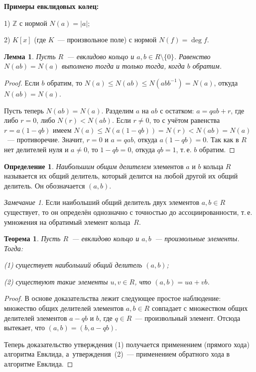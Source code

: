 \documentclass[a4paper,10pt]{amsart}
\def\ZZ{{\mathbb Z}}%
\newtheorem{theorem}{Теорема}
\newtheorem{lemma}{Лемма}
\theoremstyle{definition}
\newtheorem{definition}{Определение}
\theoremstyle{remark}
\newtheorem{remark}{Замечание}
\begin{document}
\textbf{Примеры евклидовых колец:}

1) $\ZZ$ с нормой $N(a) = |a|$;

2) $K[x]$ (где $K$~--- произвольное поле) с нормой $N(f) = \deg f$.

\begin{lemma} \label{lemma_first}
Пусть $R$~--- евклидово кольцо и $a,b \in R \setminus \lbrace 0
\rbrace$. Равенство $N(ab) = N(a)$ выполнено тогда и только тогда,
когда $b$ обратим.
\end{lemma}

\begin{proof}
Если $b$ обратим, то $N(a)\leqslant N(ab)\leqslant
N(abb^{-1})=N(a)$, откуда $N(ab)=N(a)$.

Пусть теперь $N(ab) = N(a)$. Разделим $a$ на $ab$ с остатком: $a =
qab + r$, где либо $r = 0$, либо $N(r) < N(ab)$. Если $r \ne 0$, то
с учётом равенства $r = a(1-qb)$ имеем $N(a) \leqslant N(a(1-qb)) =
N(r) < N(ab) = N(a)$~--- противоречие. Значит, $r = 0$ и $a = qab$,
откуда $a(1 - qb) = 0$. Так как в $R$ нет делителей нуля и $a \ne
0$, то $1 - qb = 0$, откуда $qb = 1$, т.\,е. $b$ обратим.
\end{proof}

\begin{definition}
{\it Наибольшим общим делителем} элементов $a$ и $b$ кольца $R$
называется их общий делитель, который делится на любой другой их
общий делитель. Он обозначается $(a,b)$.
\end{definition}

\begin{remark}
Если наибольший общий делитель двух элементов $a,b \in R$
существует, то он определён однозначно с точностью до
ассоциированности, т.\,е. умножения на обратимый элемент кольца~$R$.
\end{remark}

\begin{theorem} \label{thm_lcd}
Пусть $R$~--- евклидово кольцо и $a,b$~--- произвольные элементы.
Тогда:

\textup{(1)} существует наибольший общий делитель $(a,b)$;

\textup{(2)} существуют такие элементы $u,v \in R$, что $(a,b) = ua
+ vb$.
\end{theorem}

\begin{proof}
В основе доказательства лежит следующее простое наблюдение:
множество общих делителей элементов $a,b \in R$ совпадает с
множеством общих делителей элементов $a - qb$ и $b$, где $q \in
R$~--- произвольный элемент. Отсюда вытекает, что $(a,b) = (b, a -
qb)$.

Теперь доказательство утверждения (1) получается применением
(прямого хода) алгоритма Евклида, а~утверждения~(2)~--- применением
обратного хода в алгоритме Евклида.
\end{proof}
\end{document}
